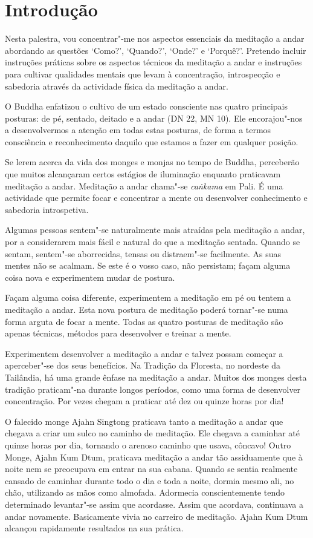 \chapter{Introdução}

Nesta palestra, vou concentrar"-me nos aspectos essenciais da meditação a
andar abordando as questões `Como?', `Quando?', `Onde?' e `Porquê?'.
Pretendo incluir instruções práticas sobre os aspectos técnicos da
meditação a andar e instruções para cultivar qualidades mentais que
levam à concentração, introspecção e sabedoria através da actividade
física da meditação a andar.

O Buddha enfatizou o cultivo de um estado consciente nas quatro
principais posturas: de pé, sentado, deitado e a andar (DN 22, MN 10). Ele
encorajou"-nos a desenvolvermos a atenção em todas estas posturas, de forma a termos
consciência e reconhecimento daquilo que estamos a fazer em
qualquer posição.

Se lerem acerca da vida dos monges e monjas no tempo de Buddha,
perceberão que muitos alcançaram certos estágios de iluminação enquanto
praticavam meditação a andar. Meditação a andar chama"-se \emph{caṅkama}
em Pali. É uma actividade que permite focar e concentrar a mente
ou desenvolver conhecimento e sabedoria introspetiva.

Algumas pessoas sentem"-se naturalmente mais atraídas pela meditação a
andar, por a considerarem mais fácil e natural do que a meditação
sentada. Quando se sentam, sentem"-se aborrecidas, tensas ou distraem"-se
facilmente. As suas mentes não se acalmam. Se este é o vosso caso, não
persistam; façam alguma coisa nova e experimentem mudar de postura.

Façam alguma coisa diferente, experimentem a meditação em pé ou tentem a
meditação a andar. Esta nova postura de meditação poderá tornar"-se numa
forma arguta de focar a mente. Todas as quatro posturas de meditação são
apenas técnicas, métodos para desenvolver e treinar a mente.

Experimentem desenvolver a meditação a andar e talvez possam começar a
aperceber"-se dos seus benefícios. Na Tradição da Floresta, no nordeste
da Tailândia, há uma grande ênfase na meditação a andar. Muitos dos
monges desta tradição praticam"-na durante longos períodos, como uma
forma de desenvolver concentração. Por vezes chegam a praticar até dez
ou quinze horas por dia!

O falecido monge Ajahn Singtong praticava tanto a meditação a
andar que chegava a criar um sulco no caminho de meditação. Ele chegava
a caminhar até quinze horas por dia, tornando o arenoso caminho que
usava, côncavo! Outro Monge, Ajahn Kum Dtum, praticava meditação
a andar tão assiduamente que à noite nem se preocupava em entrar na sua
cabana. Quando se sentia realmente cansado de caminhar durante todo o
dia e toda a noite, dormia mesmo ali, no chão, utilizando as mãos como
almofada. Adormecia conscientemente tendo determinado levantar"-se
assim que acordasse. Assim que acordava, continuava a andar novamente.
Basicamente vivia no carreiro de meditação. Ajahn Kum Dtum
alcançou rapidamente resultados na sua prática.

